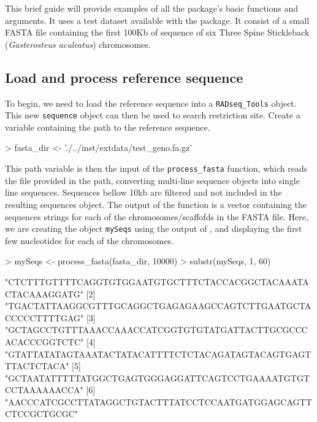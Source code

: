 \documentclass{article}
\begin{document}
This brief guide will provide examples of all the package's basic functions and arguments. It uses a test dataset available with the package. It consist of a small FASTA file containing the first 100Kb of sequence of six Three Spine Stickleback (\emph{Gasterosteus aculeatus}) chromosomes.

\subsection{Load and process reference sequence}

To begin, we need to load the reference sequence into a \texttt{RADseq\_Tools} object. This new \texttt{sequence} object can then be used to search restriction site. Create a variable containing the path to the reference sequence.  
\begin{Schunk}
\begin{Sinput}
> fasta_dir <- './../inst/extdata/test_geno.fa.gz'
\end{Sinput}
\end{Schunk}
This path variable is then the input of the \texttt{process\_fasta} function, which reads the file provided in the path, converting multi-line sequence objects into single line sequences. Sequences bellow 10kb are filtered and not included in the resulting sequences object. The output of the function is a vector containing the sequences strings for each of the chromosomes/scaffofds in the FASTA file. Here, we are creating the object \texttt{mySeqs} using the output of , and displaying the first few nucleotides for each of the chromosomes. 
\begin{Schunk}
\begin{Sinput}
> mySeqs <- process_fasta(fasta_dir, 10000)
> substr(mySeqs, 1, 60)
\end{Sinput}
\begin{Soutput}
[1] "CTCTTTGTTTTCAGGTGTGGAATGTGCTTTCTACCACGGCTACAAATACTACAAAGGATG"
[2] "TGACTATTAAGGCGTTTGCAGGCTGAGAGAAGCCAGTCTTGAATGCTACCCCCTTTTGAG"
[3] "GCTAGCCTGTTTAAACCAAACCATCGGTGTGTATGATTACTTGCGCCCACACCCGGTCTC"
[4] "GTATTATATAGTAAATACTATACATTTTCTCTACAGATAGTACAGTGAGTTTACTCTACA"
[5] "GCTAATATTTTTATGGCTGAGTGGGAGGATTCAGTCCTGAAAATGTGTCCTAAAAAACCA"
[6] "AACCCATCGCCTTATAGGCTGTACTTTATCCTCCAATGATGGAGCAGTTCTCCGCTGCGC"
\end{Soutput}
\end{Schunk}
\end{document}
